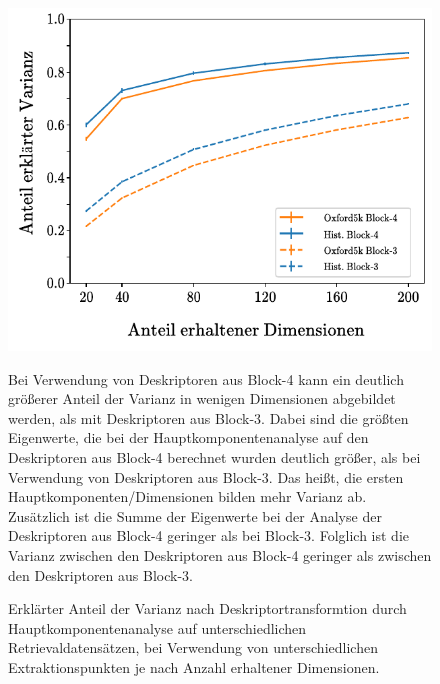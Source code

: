 \begin{figure}[h]
\begin{center}


\includegraphics[scale=1.3]{NNOPT/Anhang/explained_variance_layer4}
\caption{Erklärter Anteil der Varianz nach Deskriptortransformtion durch Hauptkomponentenanalyse auf unterschiedlichen Retrievaldatensätzen, bei Verwendung von unterschiedlichen Extraktionspunkten je nach Anzahl erhaltener Dimensionen. }
\label{hyperopt_layer4_3}
\end{center}

Bei Verwendung von Deskriptoren aus Block-4 kann ein deutlich größerer Anteil der Varianz in wenigen Dimensionen abgebildet werden, als mit Deskriptoren aus Block-3. Dabei sind die größten Eigenwerte, die bei der Hauptkomponentenanalyse auf den Deskriptoren aus Block-4 berechnet wurden deutlich größer, als bei Verwendung von Deskriptoren aus Block-3. Das heißt, die ersten Hauptkomponenten/Dimensionen bilden mehr Varianz ab. Zusätzlich ist die Summe der Eigenwerte bei der Analyse der Deskriptoren aus Block-4 geringer als bei Block-3. Folglich ist die Varianz zwischen den Deskriptoren aus Block-4 geringer als zwischen den Deskriptoren aus Block-3.
\end{figure}

